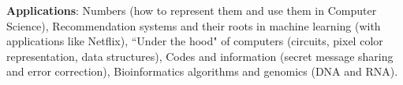 \documentclass[12pt, oneside]{article}
\begin{document}
{\bf Applications}: Numbers (how to represent them and use them in Computer Science), 
Recommendation systems and their roots in machine learning (with applications like Netflix),
``Under the hood" of computers (circuits, pixel color representation, data structures),
Codes and information (secret message sharing and error correction),
Bioinformatics algorithms and genomics (DNA and RNA).
\end{document}
